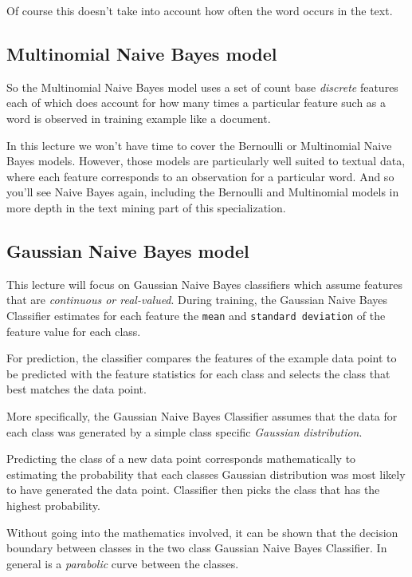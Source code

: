 \begin{multicols}{2}
Of course this doesn't take into account how often the word occurs in the text. 

\subsection{Multinomial Naive Bayes model}

So the Multinomial Naive Bayes model uses a set of count base \emph{discrete} features each of which does account for how many times a particular feature such as a word is observed in training example like a document. 

In this lecture we won't have time to cover the Bernoulli or Multinomial Naive Bayes models. However, those models are particularly well suited to textual data, where each feature corresponds to an observation for a particular word. And so you'll see Naive Bayes again, including the Bernoulli and Multinomial models in more depth in the text mining part of this specialization. 

\subsection{Gaussian Naive Bayes model}

This lecture will focus on Gaussian Naive Bayes classifiers which assume features that are \emph{continuous or real-valued}. During training, the Gaussian Naive Bayes Classifier estimates for each feature the \texttt{mean} and \texttt{standard deviation} of the feature value for each class. 

For prediction, the classifier compares the features of the example data point to be predicted with the feature statistics for each class and selects the class that best matches the data point. 

More specifically, the Gaussian Naive Bayes Classifier assumes that the data for each class was generated by a simple class specific \emph{Gaussian distribution}. 

Predicting the class of a new data point corresponds mathematically to estimating the probability that each classes Gaussian distribution was most likely to have generated the data point. Classifier then picks the class that has the highest probability. 

Without going into the mathematics involved, it can be shown that the decision boundary between classes in the two class Gaussian Naive Bayes Classifier. In general is a \emph{parabolic} curve between the classes. 


\end{multicols}
